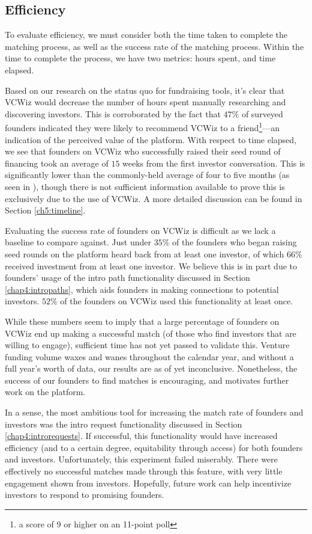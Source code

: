 \subsection{Efficiency}

To evaluate efficiency, we must consider both the time taken to complete the matching process, as well as the success rate of the matching process. Within the time to complete the process, we have two metrics: hours spent, and time elapsed.

Based on our research on the status quo for fundraising tools, it's clear that VCWiz would decrease the number of hours spent manually researching and discovering investors. This is corroborated by the fact that $47\%$ of surveyed founders indicated they were likely to recommend VCWiz to a friend\footnote{a score of 9 or higher on an 11-point poll}---an indication of the perceived value of the platform. With respect to time elapsed, we see that founders on VCWiz who successfully raised their seed round of financing took an average of $15$ weeks from the first investor conversation. This is significantly lower than the commonly-held average of four to five months (as seen in \cite{BRUNO198561}), though there is not sufficient information available to prove this is exclusively due to the use of VCWiz. A more detailed discussion can be found in Section \ref{ch5:timeline}.

Evaluating the success rate of founders on VCWiz is difficult as we lack a baseline to compare against. Just under $35\%$ of the founders who began raising seed rounds on the platform heard back from at least one investor, of which $66\%$ received investment from at least one investor. We believe this is in part due to founders' usage of the intro path functionality discussed in Section \ref{chap4:intropaths}, which aids founders in making connections to potential investors. $52\%$ of the founders on VCWiz used this functionality at least once.

While these numbers seem to imply that a large percentage of founders on VCWiz end up making a successful match (of those who find investors that are willing to engage), sufficient time has not yet passed to validate this. Venture funding volume waxes and wanes throughout the calendar year, and without a full year's worth of data, our results are as of yet inconclusive. Nonetheless, the success of our founders to find matches is encouraging, and motivates further work on the platform.

In a sense, the most ambitious tool for increasing the match rate of founders and investors was the intro request functionality discussed in Section \ref{chap4:introrequests}. If successful, this functionality would have increased efficiency (and to a certain degree, equitability through access) for both founders and investors. Unfortunately, this experiment failed miserably. There were effectively no successful matches made through this feature, with very little engagement shown from investors. Hopefully, future work can help incentivize investors to respond to promising founders.
